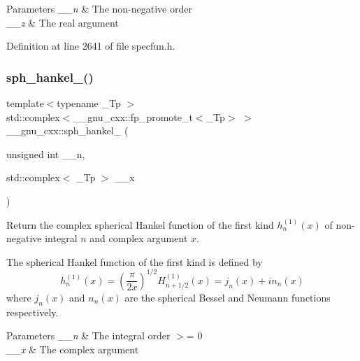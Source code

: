 \begin{DoxyParams}{Parameters}
{\em \+\_\+\+\_\+n} & The non-\/negative order \\
\hline
{\em \+\_\+\+\_\+z} & The real argument \\
\hline
\end{DoxyParams}


Definition at line 2641 of file specfun.\+h.

\mbox{\label{group__gnu__math__spec__func_ga3d256857c000a966e89526cb99253aca}} 
\subsubsection{\texorpdfstring{sph\+\_\+hankel\+\_()}{sph\_hankel\_1()}\hspace{0.1cm}{\footnotesize\ttfamily [2/2]}}
{\footnotesize\ttfamily template$<$typename \+\_\+\+Tp $>$ \\
std\+::complex$<$\+\_\+\+\_\+gnu\+\_\+cxx\+::fp\+\_\+promote\+\_\+t$<$\+\_\+\+Tp$>$ $>$ \+\_\+\+\_\+gnu\+\_\+cxx\+::sph\+\_\+hankel\+\_ (\begin{DoxyParamCaption}\item[{unsigned int}]{\+\_\+\+\_\+n,  }\item[{std\+::complex$<$ \+\_\+\+Tp $>$}]{\+\_\+\+\_\+x }\end{DoxyParamCaption})\hspace{0.3cm}{\ttfamily [inline]}}

Return the complex spherical Hankel function of the first kind $ h^{(1)}_n(x) $ of non-\/negative integral $ n $ and complex argument $ x $.

The spherical Hankel function of the first kind is defined by \[ h^{(1)}_n(x) = \left(\frac{\pi}{2x} \right) ^{1/2} H^{(1)}_{n+1/2}(x) = j_n(x) + i n_n(x) \] where $ j_n(x) $ and $ n_n(x) $ are the spherical Bessel and Neumann functions respectively.


\begin{DoxyParams}{Parameters}
{\em \+\_\+\+\_\+n} & The integral order $>$= 0 \\
\hline
{\em \+\_\+\+\_\+x} & The complex argument \\
\hline
\end{DoxyParams}


